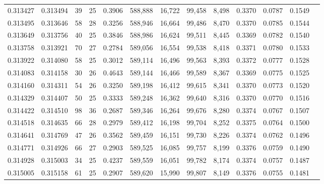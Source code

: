 \begin{tabular}{rrrrrrrrrrrrr}
0.313427 & 0.313494 &  39 &  25 &                                     0.3906 & 588,888 &  16,722 &  99,458 &   8,498 & 0.3370 & 0.0787 & 0.1549 \\
0.313495 & 0.313646 &  58 &  28 &                                     0.3256 & 588,946 &  16,664 &  99,486 &   8,470 & 0.3370 & 0.0785 & 0.1544 \\
0.313649 & 0.313756 &  40 &  25 &                                     0.3846 & 588,986 &  16,624 &  99,511 &   8,445 & 0.3369 & 0.0782 & 0.1540 \\
0.313758 & 0.313921 &  70 &  27 &                                     0.2784 & 589,056 &  16,554 &  99,538 &   8,418 & 0.3371 & 0.0780 & 0.1533 \\
0.313922 & 0.314080 &  58 &  25 &                                     0.3012 & 589,114 &  16,496 &  99,563 &   8,393 & 0.3372 & 0.0777 & 0.1528 \\
0.314083 & 0.314158 &  30 &  26 &                                     0.4643 & 589,144 &  16,466 &  99,589 &   8,367 & 0.3369 & 0.0775 & 0.1525 \\
0.314160 & 0.314311 &  54 &  26 &                                     0.3250 & 589,198 &  16,412 &  99,615 &   8,341 & 0.3370 & 0.0773 & 0.1520 \\
0.314329 & 0.314407 &  50 &  25 &                                     0.3333 & 589,248 &  16,362 &  99,640 &   8,316 & 0.3370 & 0.0770 & 0.1516 \\
0.314422 & 0.314510 &  98 &  36 &                                     0.2687 & 589,346 &  16,264 &  99,676 &   8,280 & 0.3374 & 0.0767 & 0.1507 \\
0.314518 & 0.314635 &  66 &  28 &                                     0.2979 & 589,412 &  16,198 &  99,704 &   8,252 & 0.3375 & 0.0764 & 0.1500 \\
0.314641 & 0.314769 &  47 &  26 &                                     0.3562 & 589,459 &  16,151 &  99,730 &   8,226 & 0.3374 & 0.0762 & 0.1496 \\
0.314771 & 0.314926 &  66 &  27 &                                     0.2903 & 589,525 &  16,085 &  99,757 &   8,199 & 0.3376 & 0.0759 & 0.1490 \\
0.314928 & 0.315003 &  34 &  25 &                                     0.4237 & 589,559 &  16,051 &  99,782 &   8,174 & 0.3374 & 0.0757 & 0.1487 \\
0.315005 & 0.315158 &  61 &  25 &                                     0.2907 & 589,620 &  15,990 &  99,807 &   8,149 & 0.3376 & 0.0755 & 0.1481 \\

\end{tabular}
